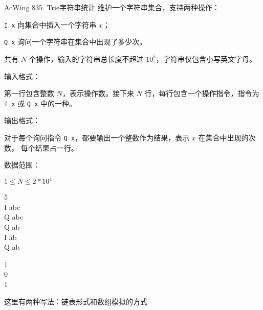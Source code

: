 \begin{titledbox}{AcWing 835. Trie字符串统计}
维护一个字符串集合，支持两种操作：

\lstinline{I x} 向集合中插入一个字符串 $x$；

\lstinline{Q x} 询问一个字符串在集合中出现了多少次。

共有 $N$ 个操作，输入的字符串总长度不超过 $10^5$，字符串仅包含小写英文字母。

输入格式：

第一行包含整数 $N$，表示操作数。接下来 $N$ 行，每行包含一个操作指令，指令为 \lstinline{I x} 或 \lstinline{Q x} 中的一种。

输出格式：

对于每个询问指令 \lstinline{Q x}，都要输出一个整数作为结果，表示 $x$ 在集合中出现的次数。
每个结果占一行。

数据范围：

$1 \le N \le 2*10^4$

\begin{inputblock}
    5 \\
    I abc \\
    Q abc \\
    Q ab \\
    I ab \\
    Q ab
\end{inputblock}
\begin{outputblock}
    1 \\
    0 \\
    1
\end{outputblock}
\end{titledbox}

这里有两种写法：链表形式和数组模拟的方式

